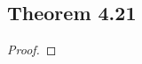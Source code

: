 \documentclass[../../main.tex]{subfiles}
\begin{document}
\subsection{Theorem 4.21}
\begin{wts}

\end{wts}
\begin{proof}

\end{proof}
\end{document}
